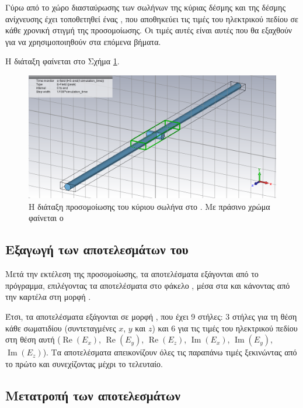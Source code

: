 Γύρω από το χώρο διασταύρωσης των σωλήνων της κύριας δέσμης και της δέσμης ανίχνευσης έχει τοποθετηθεί ένας , που αποθηκεύει τις τιμές του ηλεκτρικού πεδίου σε κάθε χρονική στιγμή της προσομοίωσης. 
Οι τιμές αυτές είναι αυτές που θα εξαχθούν για να χρησιμοποιηθούν στα επόμενα βήματα.

Η διάταξη φαίνεται στο Σχήμα \ref{fig:CST-export-main-beam-project-efield-box}.

\begin{figure}[tbh]
\includegraphics[width=\textwidth]{figures/export-main-beam-project-efield-box}
\centering
\caption[Η διάταξη προσομοίωσης του κύριου σωλήνα στο ]{Η διάταξη προσομοίωσης του κύριου σωλήνα στο . Με πράσινο χρώμα φαίνεται ο }
\label{fig:CST-export-main-beam-project-efield-box}
\end{figure}

\subsection{Εξαγωγή των αποτελεσμάτων του }
Μετά την εκτέλεση της προσομοίωσης, τα αποτελέσματα εξάγονται από το πρόγραμμα, επιλέγοντας τα αποτελέσματα στο φάκελο , μέσα στα  και κάνοντας  από την καρτέλα  στη μορφή .

Έτσι, τα αποτελέσματα εξάγονται σε μορφή , που έχει 9 στήλες: 3 στήλες για τη θέση κάθε σωματιδίου (συντεταγμένες $x$, $y$ και $z$) και 6 για τις τιμές του ηλεκτρικού πεδίου στη θέση αυτή ($\operatorname{Re}(E_x)$, $\operatorname{Re}(E_y)$, $\operatorname{Re}(E_z)$, $\operatorname{Im}(E_x)$, $\operatorname{Im}(E_y)$, $\operatorname{Im}(E_z)$).
Τα αποτελέσματα απεικονίζουν όλες τις παραπάνω τιμές ξεκινώντας από το πρώτο  και συνεχίζοντας μέχρι το τελευταίο.

\subsection{Μετατροπή των αποτελεσμάτων}

